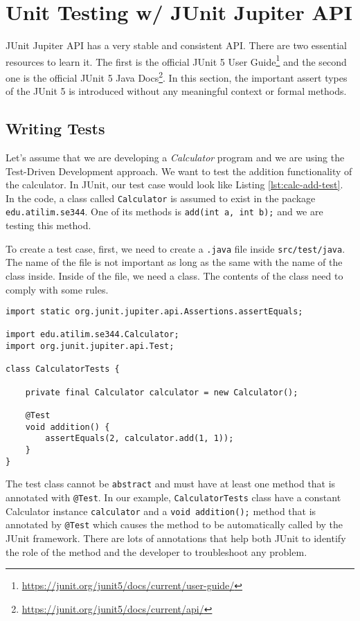 \chapter{Unit Testing w/ JUnit Jupiter API}
JUnit Jupiter API has a very stable and consistent API. There are two essential resources to learn it. The first is the official JUnit 5 User Guide\footnote{\url{https://junit.org/junit5/docs/current/user-guide/}} and the second one is the official JUnit 5 Java Docs\footnote{\url{https://junit.org/junit5/docs/current/api/}}. In this section, the important assert types of the JUnit 5 is introduced without any meaningful context or formal methods.

\section{Writing Tests}
Let's assume that we are developing a \emph{Calculator} program and we are using the Test-Driven Development approach. We want to test the addition functionality of the calculator. In JUnit, our test case would look like Listing \ref{lst:calc-add-test}. In the code, a class called \verb|Calculator| is assumed to exist in the package \verb|edu.atilim.se344|. One of its methods is \lstinline{add(int a, int b);} and we are testing this method.

To create a test case, first, we need to create a \verb|.java| file inside \verb|src/test/java|. The name of the file is not important as long as the same with the name of the class inside. Inside of the file, we need a class. The contents of the class need to comply with some rules.

\begin{lstlisting}[caption={A test case for testing the addition functionality of the Calculator class.},label=lst:calc-add-test]
import static org.junit.jupiter.api.Assertions.assertEquals;

import edu.atilim.se344.Calculator;
import org.junit.jupiter.api.Test;

class CalculatorTests {

    private final Calculator calculator = new Calculator();

    @Test
    void addition() {
        assertEquals(2, calculator.add(1, 1));
    }
}
\end{lstlisting}

The test class cannot be \lstinline{abstract} and must have at least one method that is annotated with \lstinline{@Test}. In our example, \verb|CalculatorTests| class have a constant Calculator instance \verb|calculator| and a \lstinline{void addition();} method that is annotated by \lstinline{@Test} which causes the method to be automatically called by the JUnit framework. There are lots of annotations that help both JUnit to identify the role of the method and the developer to troubleshoot any problem.

